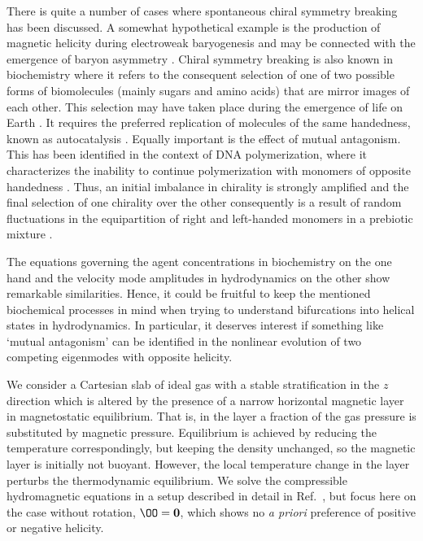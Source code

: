 \documentclass[twocolumn,showpacs,preprintnumbers,superscriptaddress]{revtex4}
\begin{document}
There is quite a number of cases where spontaneous chiral symmetry
breaking has been discussed.
A somewhat hypothetical example is the production of magnetic helicity
during electroweak baryogenesis \cite{Vac01} and may be
connected with the emergence of baryon asymmetry \cite{JS97}.
Chiral symmetry breaking is also known in biochemistry where it
refers to the consequent selection of one of
two possible forms of biomolecules
(mainly sugars and amino acids)
that are mirror images of each other.
This selection may have taken place during the emergence of life on Earth
\cite{Kondepudi}.
It requires the preferred
replication of molecules of the same handedness,
known as autocatalysis \cite{Frank,Soai}.
Equally important is the effect of mutual antagonism.
This has been identified in the context of DNA
polymerization, where it characterizes the inability to
continue polymerization with
monomers of opposite handedness \cite{Joy84}.
Thus, an initial imbalance in chirality is strongly amplified and
the final selection of one chirality over the other consequently is a result of
random fluctuations in the equipartition of right and left-handed monomers
in a prebiotic mixture  \cite{BLL07}.

The equations governing the agent concentrations in biochemistry
\citep[e.g., Ref.][]{Kondepudi} on the
one hand and the velocity mode amplitudes in hydrodynamics
\citep[e.g.,][]{Fau} on the other show remarkable similarities.
Hence, it could be fruitful to keep the mentioned biochemical processes in
mind when trying to understand bifurcations into helical states in hydrodynamics.
In particular, it deserves interest if something like `mutual antagonism'
can be identified in the nonlinear evolution of two competing eigenmodes
with opposite helicity.

We consider a Cartesian slab
of ideal gas with a stable stratification in the $z$ direction which is
altered by the presence of a narrow horizontal magnetic layer in
magnetostatic equilibrium.
That is, in the layer a fraction of the gas pressure is
substituted by magnetic pressure.
Equilibrium is achieved by reducing the temperature correspondingly, but
keeping the density unchanged, so the magnetic layer is initially not buoyant.
However, the local temperature change in the layer perturbs the
thermodynamic equilibrium.
We solve the compressible hydromagnetic equations in a setup
described in detail in Ref.~\cite{CMRB10},
but focus here on the case without rotation,
$\OO={\bf0}$,
which shows no {\it a priori} preference of positive or negative helicity.
\end{document}
